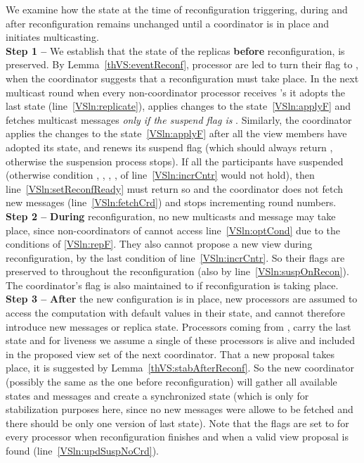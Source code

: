 \documentclass[11pt]{article}
\newenvironment{proof}{\noindent{\bf Proof.}}{\hfill}
\begin{document}
\begin{proof}
We examine how the state at the time of reconfiguration triggering, during and after reconfiguration remains unchanged until a coordinator is in place and initiates multicasting.\\
\textbf{Step 1 --} We establish that the state of the replicas \textbf{before} reconfiguration, is preserved.
By Lemma~\ref{thVS:eventReconf}, processor are led to turn their flag  to , when the coordinator  suggests that a reconfiguration must take place.
In the next multicast round when every non-coordinator processor receives 's  it adopts the last state (line~\ref{VSln:replicate}), applies changes to the state~\ref{VSln:applyF} and fetches multicast messages \emph{only if the suspend flag is }.
Similarly, the coordinator applies the changes to the state~\ref{VSln:applyF} after all the view members have adopted its state, and renews its suspend flag (which should always return , otherwise the suspension process stops). 
If all the participants have suspended (otherwise condition      , ,   , ,   of line~\ref{VSln:incrCntr} would not hold), then line~\ref{VSln:setReconfReady} must return  so  and the coordinator does not fetch new messages (line~\ref{VSln:fetchCrd}) and stops incrementing round numbers. \\
\textbf{Step 2 -- } \textbf{During} reconfiguration, no new multicasts and message  may take place, since non-coordinators of  cannot access line~\ref{VSln:optCond} due to the conditions of \ref{VSln:repF}.
They also cannot propose a new view during reconfiguration, by the last condition of line~\ref{VSln:incrCntr}.
So their  flags are preserved to  throughout the reconfiguration (also by line~\ref{VSln:suspOnRecon}).
The coordinator's flag is also maintained to  if reconfiguration is taking place. \\
\textbf{Step 3 --} \textbf{After} the new configuration  is in place, new processors are assumed to access the computation with default values in their state, and cannot therefore introduce new messages or replica state.
Processors coming from , carry the last state and for liveness we assume a single of these processors is alive and included in the proposed view set of the next coordinator. That a new proposal takes place, it is suggested by Lemma~\ref{thVS:stabAfterReconf}.
So the new coordinator (possibly the same as the one before reconfiguration) will gather all available states and messages and create a synchronized state (which is only for stabilization purposes here, since no new messages were allowe to be fetched and there should be only one version of last state).
Note that the  flags are set to  for every processor when reconfiguration finishes and when a valid view proposal is found (line~\ref{VSln:updSuspNoCrd}).
\end{proof}\\
\end{document}
